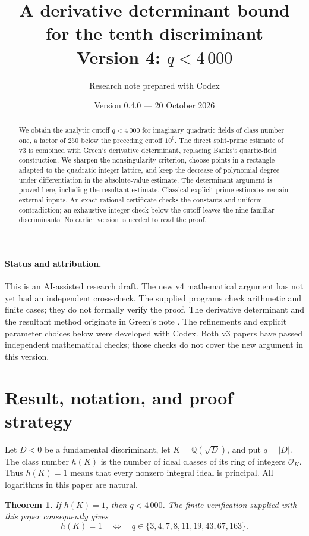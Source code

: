 \documentclass[11pt]{article}
\title{A derivative determinant bound for the tenth discriminant\\
\large Version 4: \(q<4\,000\)}
\author{Research note prepared with Codex}
\date{Version 0.4.0 --- 20 October 2026}
\newtheorem{theorem}{Theorem}
\newcommand{\Q}{\mathbb Q}
\newcommand{\OK}{\mathcal O_K}
\begin{document}
\maketitle

\begin{abstract}
We obtain the analytic cutoff \(q<4\,000\) for imaginary quadratic fields
of class number one, a factor of 250 below the preceding cutoff \(10^6\).
The direct split-prime estimate of v3 is combined with Green's derivative
determinant, replacing Banks's quartic-field construction. We sharpen the
nonsingularity criterion, choose points in a rectangle adapted to the
quadratic integer lattice, and keep the decrease of polynomial degree
under differentiation in the absolute-value estimate. The determinant
argument is proved here, including the resultant estimate. Classical
explicit prime estimates remain external inputs. An exact rational
certificate checks the constants and uniform contradiction; an
exhaustive integer check below the cutoff leaves the nine familiar
discriminants. No earlier version is needed to read the proof.
\end{abstract}

\paragraph{Status and attribution.}
This is an AI-assisted research draft.
The new v4 mathematical argument has not yet had an independent
cross-check. The supplied programs check arithmetic and finite cases;
they do not formally verify the proof. The derivative determinant and
the resultant method originate in Green's note \cite{green}. The
refinements and explicit parameter choices below were developed with
Codex. Both v3 papers have passed independent mathematical checks;
those checks do not cover the new argument in this version.

\section{Result, notation, and proof strategy}

Let \(D<0\) be a fundamental discriminant, let
\(K=\Q(\sqrt D)\), and put \(q=|D|\). The class number \(h(K)\)
is the number of ideal classes of its ring of integers \(\OK\).
Thus \(h(K)=1\) means that every nonzero integral ideal is principal.
All logarithms in this paper are natural.

\begin{theorem}\label{main}
If \(h(K)=1\), then \(q<4\,000\).
The finite verification supplied with this paper consequently gives
\[
 h(K)=1\quad\Longleftrightarrow\quad
 q\in\{3,4,7,8,11,19,43,67,163\}.
\]
\end{theorem}
\end{document}
